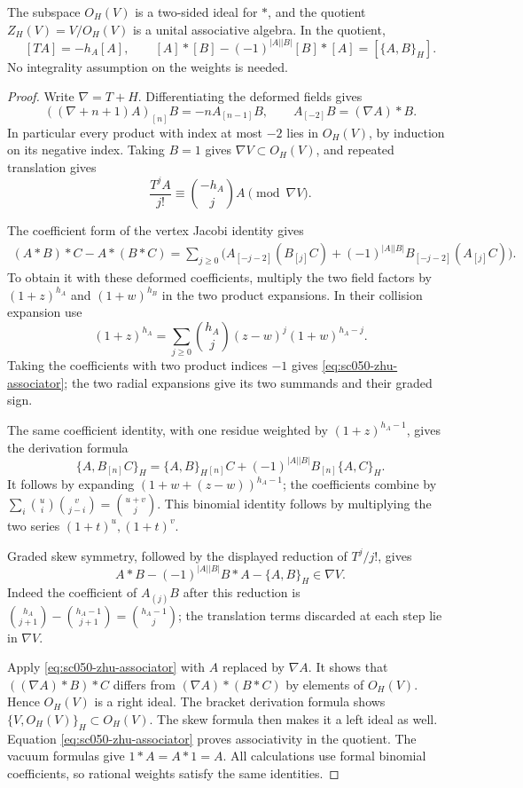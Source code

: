 \begin{lemma}\label{lem:sc050-zhu-quotient}
The subspace \(O_H(V)\) is a two-sided ideal for \(*\), and the
quotient \(Z_H(V)=V/O_H(V)\) is a unital associative algebra.
In the quotient,
\begin{equation}\label{eq:sc050-zhu-relations}
 [TA]=-h_A[A],\qquad
 [A]*[B]-(-1)^{|A||B|}[B]*[A]=[\{A,B\}_H].
\end{equation}
No integrality assumption on the weights is needed.
\end{lemma}
\begin{proof}
Write \(\nabla=T+H\). Differentiating the deformed fields gives
\[
 ((\nabla+n+1)A)_{[n]}B=-nA_{[n-1]}B,\qquad
 A_{[-2]}B=(\nabla A)*B.
\]
In particular every product with index at most \(-2\) lies in
\(O_H(V)\), by induction on its negative index. Taking \(B=1\)
gives \(\nabla V\subset O_H(V)\), and repeated translation gives
\[
 \frac{T^jA}{j!}\equiv\binom{-h_A}{j}A\pmod{\nabla V}.
\]

The coefficient form of the vertex Jacobi identity gives
\begin{align}
 (A*B)*C-A*(B*C)
  =\sum_{j\ge0}\bigl(
     A_{[-j-2]}(B_{[j]}C)
    +(-1)^{|A||B|}B_{[-j-2]}(A_{[j]}C)\bigr).
 \label{eq:sc050-zhu-associator}
\end{align}
To obtain it with these deformed coefficients, multiply the two
field factors by \((1+z)^{h_A}\) and \((1+w)^{h_B}\) in the
two product expansions. In their collision expansion use
\[
 (1+z)^{h_A}
  =\sum_{j\ge0}\binom{h_A}{j}(z-w)^j(1+w)^{h_A-j}.
\]
Taking the coefficients with two product indices \(-1\) gives
\eqref{eq:sc050-zhu-associator}; the two radial expansions give
its two summands and their graded sign.

The same coefficient identity, with one residue weighted by
\((1+z)^{h_A-1}\), gives the derivation formula
\[
 \{A,B_{[n]}C\}_H
   =\{\!A,B\!\}_H{}_{[n]}C
      +(-1)^{|A||B|}B_{[n]}\{A,C\}_H.
\]
It follows by expanding \((1+w+(z-w))^{h_A-1}\);
the coefficients combine by
\(\sum_i\binom{u}{i}\binom{v}{j-i}=\binom{u+v}{j}\).
This binomial identity follows by multiplying the two series
\((1+t)^u,(1+t)^v\).

Graded skew symmetry, followed by the displayed reduction of
\(T^j/j!\), gives
\[
 A*B-(-1)^{|A||B|}B*A-\{A,B\}_H\in\nabla V.
\]
Indeed the coefficient of \(A_{(j)}B\) after this reduction is
\(\binom{h_A}{j+1}-\binom{h_A-1}{j+1}
 =\binom{h_A-1}{j}\); the translation terms discarded at each
step lie in \(\nabla V\).

Apply \eqref{eq:sc050-zhu-associator} with \(A\) replaced by
\(\nabla A\). It shows that
\(((\nabla A)*B)*C\) differs from
\((\nabla A)*(B*C)\) by elements of \(O_H(V)\).
Hence \(O_H(V)\) is a right ideal. The bracket derivation formula
shows \(\{V,O_H(V)\}_H\subset O_H(V)\).
The skew formula then makes it a left ideal as well.
Equation \eqref{eq:sc050-zhu-associator} proves associativity in
the quotient. The vacuum formulas give \(1*A=A*1=A\).
All calculations use formal binomial coefficients, so rational
weights satisfy the same identities.
\end{proof}

